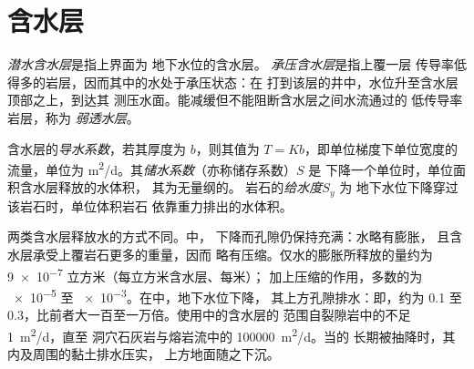\section{含水层}\label{sec:b3:hydrogeology:aquifers}

\begin{definition}\label{def:b3:hydrogeology:aquifer-types}
\emph{潜水含水层}是指上界面为
地下水位的含水层。
\emph{承压含水层}是指上覆一层
传导率低得多的岩层，因而其中的水处于承压状态：在
打到该层的井中，水位升至含水层顶部之上，到达其
测压水面。能减缓但不能阻断含水层之间水流通过的
低传导率岩层，称为
\emph{弱透水层}。
\end{definition}

\begin{definition}\label{def:b3:hydrogeology:storage}
含水层的\emph{导水系数}，若其厚度为
$b$，则其值为 $T = Kb$，即单位梯度下单位宽度的流量，单位为
\unit{m^2/d}。其\emph{储水系数}（亦称储存系数）$S$ 是
下降一个单位时，单位面积含水层释放的水体积，
其为无量纲的。
岩石的\emph{给水度}$S_y$ 为
地下水位下降穿过该岩石时，单位体积岩石
依靠重力排出的水体积。
\end{definition}

两类含水层释放水的方式不同。中，
下降而孔隙仍保持充满：水略有膨胀，
且含水层承受上覆岩石更多的重量，因而
略有压缩。仅水的膨胀所释放的量约为
\num{9e-7} 立方米（每立方米含水层、每米）；
加上压缩的作用，多数的为
\num{e-5} 至 \num{e-3}。在中，地下水位下降，
其上方孔隙排水：即，约为 0.1
至 0.3，比前者大一百至一万倍。使用中的含水层的
范围自裂隙岩中的不足 \qty{1}{m^2/d}，直至
洞穴石灰岩与熔岩流中的 \qty{100000}{m^2/d}。当的
长期被抽降时，其内及周围的黏土排水压实，
上方地面随之下沉。

